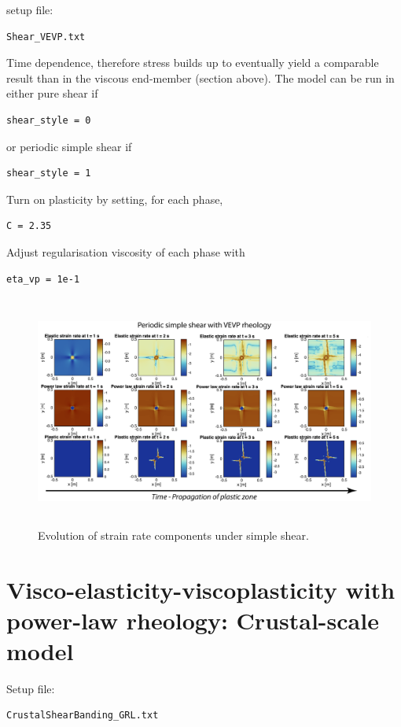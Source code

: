 \documentclass[12pt,english,openany]{scrbook}
\begin{document}
setup file:
\begin{verbatim} 
Shear_VEVP.txt
\end{verbatim}

Time dependence, therefore stress builds up to eventually yield a comparable result than in the viscous end-member (section above).
The model can be run in either pure shear if 
\begin{verbatim} 
shear_style = 0
\end{verbatim}

or periodic simple shear if 
\begin{verbatim} 
shear_style = 1
\end{verbatim}

Turn on plasticity by setting, for each phase,
\begin{verbatim} 
C = 2.35
\end{verbatim}

Adjust regularisation viscosity of each phase with
\begin{verbatim} 
eta_vp = 1e-1
\end{verbatim}

\begin{figure}[ht!]
\centerline{\includegraphics[height=3.0in]{./Figures/PeriodicSimpleShearVEVP_MDOODZ.png}}
\caption{Evolution of strain rate components under simple shear.}
\label{PeriodicSimpleShearVEVP_MDOODZ}
\end{figure}

\section{Visco-elasticity-viscoplasticity with power-law rheology: Crustal-scale model}

Setup file:
\begin{verbatim} 
CrustalShearBanding_GRL.txt
\end{verbatim}
\end{document}
